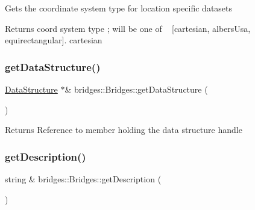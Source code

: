 Gets the coordinate system type for location specific datasets

\begin{DoxyReturn}{Returns}
coord system type ; will be one of ~\newline
\mbox{[}\textquotesingle{}cartesian\textquotesingle{}, \textquotesingle{}albers\+Usa\textquotesingle{}, \textquotesingle{}equirectangular\textquotesingle{}\mbox{]}. \textquotesingle{}cartesian\textquotesingle{} 
\end{DoxyReturn}
\mbox{\label{namespacebridges_1_1_bridges_a7cee9c57a0cd6a213722ba0a81a742f0}} 
\subsubsection{\texorpdfstring{get\+Data\+Structure()}{getDataStructure()}}
{\footnotesize\ttfamily \mbox{\hyperlink{classbridges_1_1_data_structure}{Data\+Structure}} $\ast$\& bridges\+::\+Bridges\+::get\+Data\+Structure (\begin{DoxyParamCaption}{ }\end{DoxyParamCaption})}

\begin{DoxyReturn}{Returns}
Reference to member holding the data structure handle 
\end{DoxyReturn}
\mbox{\label{namespacebridges_1_1_bridges_a11570abeb2d710440c709bafca816a64}} 
\subsubsection{\texorpdfstring{get\+Description()}{getDescription()}}
{\footnotesize\ttfamily string \& bridges\+::\+Bridges\+::get\+Description (\begin{DoxyParamCaption}{ }\end{DoxyParamCaption})}

\mbox{\label{namespacebridges_1_1_bridges_a6a7303bf89edfe41c19f30b4cc6430b9}} 

